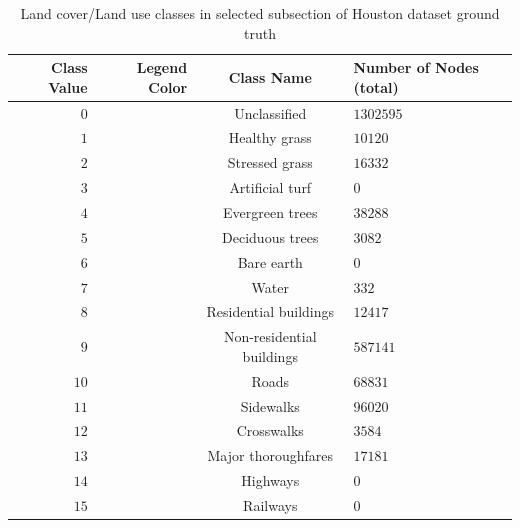 \documentclass[
twocolumn,
]{ceurart}
\begin{document}
\begin{table}
\caption{Land cover/Land use classes in selected subsection of Houston dataset ground truth}
\label{tab::classes}
\centering
\begin{tabular}{NNcZ}
\hline
\bfseries Class Value & \bfseries Legend Color & \bfseries Class Name & \bfseries Number of Nodes (total)\\
\hline
$0$ & \colorbox[rgb]{0.0,0.0,0.0}{\textcolor{white}{\phantom{A}}} & Unclassified & $1302595$\\
$1$ & \colorbox[rgb]{0.0,1.0,0.03}{\textcolor{white}{\phantom{A}}} & Healthy grass & $10120$ \\
$2$ & \colorbox[rgb]{0.21, 0.69, 0.15}{\textcolor{white}{\phantom{A}}} & Stressed grass & $16332$ \\
$3$ & \colorbox[rgb]{0.53, 0.73, 0.57}{\textcolor{white}{\phantom{A}}} & Artificial turf & $0$ \\
$4$ & \colorbox[rgb]{0.  , 0.47, 0.08}{\textcolor{white}{\phantom{A}}} & Evergreen trees & $38288$ \\
$5$ & \colorbox[rgb]{0.  , 0.3 , 0.}{\textcolor{white}{\phantom{A}}} & Deciduous trees & $3082$ \\
$6$ & \colorbox[rgb]{0.75, 0.48, 0.08}{\textcolor{white}{\phantom{A}}} & Bare earth & $0$ \\
$7$ & \colorbox[rgb]{0.  , 0.89, 0.89}{\textcolor{white}{\phantom{A}}} & Water & $332$ \\
$8$ & \colorbox[rgb]{0.98, 0.98, 0.98}{\textcolor{white}{\phantom{A}}} & Residential buildings & $12417$ \\
$9$ & \colorbox[rgb]{0.94, 0.76, 0.92}{\textcolor{white}{\phantom{A}}} & Non-residential buildings & $587141$ \\
$10$ & \colorbox[rgb]{1.  , 0.35, 0.36}{\textcolor{white}{\phantom{A}}} & Roads & $68831$ \\
$11$ & \colorbox[rgb]{0.64, 0.64, 0.64}{\textcolor{white}{\phantom{A}}} & Sidewalks & $96020$ \\
$12$ & \colorbox[rgb]{0.36, 0.36, 0.36}{\textcolor{white}{\phantom{A}}} & Crosswalks & $3584$ \\
$13$ & \colorbox[rgb]{0.79, 0.  , 0.01}{\textcolor{white}{\phantom{A}}} & Major thoroughfares & $17181$ \\
$14$ & \colorbox[rgb]{0.54, 0.  , 0.04}{\textcolor{white}{\phantom{A}}} & Highways & $0$ \\
$15$ & \colorbox[rgb]{1.  , 0.65, 0.07}{\textcolor{white}{\phantom{A}}} & Railways & $0$ \\

\end{tabular}
\end{table}
\end{document}
